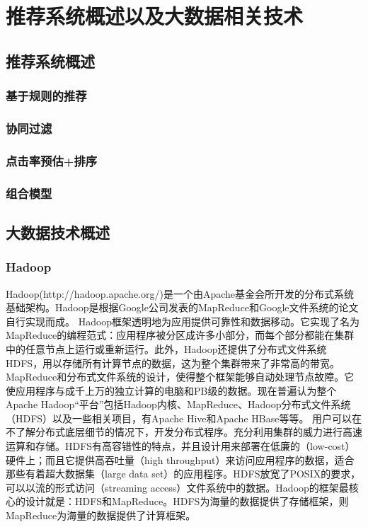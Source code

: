 \chapter{推荐系统概述以及大数据相关技术}

\section{推荐系统概述}

  \subsection{基于规则的推荐}

  \subsection{协同过滤}

  \subsection{点击率预估+排序}

  \subsection{组合模型}

\section{大数据技术概述}

  \subsection{Hadoop}
  Hadoop(http://hadoop.apache.org/)是一个由Apache基金会所开发的分布式系统基础架构。Hadoop是根据Google公司发表的MapReduce和Google文件系统的论文自行实现而成。
  Hadoop框架透明地为应用提供可靠性和数据移动。它实现了名为MapReduce的编程范式：应用程序被分区成许多小部分，而每个部分都能在集群中的任意节点上运行或重新运行。此外，Hadoop还提供了分布式文件系统\gls*{HDFS}，用以存储所有计算节点的数据，这为整个集群带来了非常高的带宽。MapReduce和分布式文件系统的设计，使得整个框架能够自动处理节点故障。它使应用程序与成千上万的独立计算的电脑和PB级的数据。现在普遍认为整个Apache Hadoop“平台”包括Hadoop内核、MapReduce、Hadoop分布式文件系统（HDFS）以及一些相关项目，有Apache Hive和Apache HBase等等。
  用户可以在不了解分布式底层细节的情况下，开发分布式程序。充分利用集群的威力进行高速运算和存储。HDFS有高容错性的特点，并且设计用来部署在低廉的（low-cost）硬件上；而且它提供高吞吐量（high throughput）来访问应用程序的数据，适合那些有着超大数据集（large data set）的应用程序。HDFS放宽了POSIX的要求，可以以流的形式访问（streaming access）文件系统中的数据。Hadoop的框架最核心的设计就是：HDFS和MapReduce。HDFS为海量的数据提供了存储框架，则MapReduce为海量的数据提供了计算框架。

